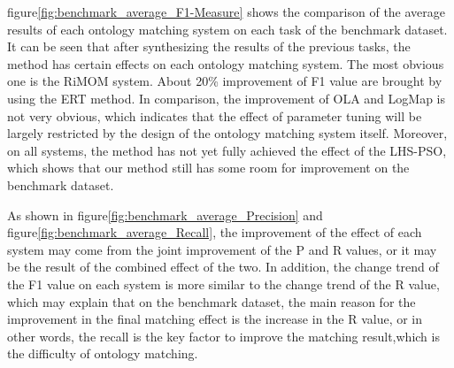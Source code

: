 \documentclass[twoside]{article}
\begin{document}
figure\ref{fig:benchmark_average_F1-Measure} shows the comparison of the average results of each ontology matching system on each task of the benchmark dataset. It can be seen that after synthesizing the results of the previous tasks, the method has certain effects on each ontology matching system. The most obvious one is the RiMOM system. About 20\% improvement of F1 value are brought by using the ERT method.
In comparison, the improvement of OLA and LogMap is not very obvious, which indicates that the effect of parameter tuning will be largely restricted by the design of the ontology matching system itself.
Moreover, on all systems, the method has not yet fully achieved the effect of the LHS-PSO, which shows that our method still has some room for improvement on the benchmark dataset.

As shown in figure\ref{fig:benchmark_average_Precision} and figure\ref{fig:benchmark_average_Recall}, the improvement of the effect of each system may come from the joint improvement of the P and R values, or it may be the result of the combined effect of the two.
In addition, the change trend of the F1 value on each system is more similar to the change trend of the R value, which may explain that on the benchmark dataset, the main reason for the improvement in the final matching effect is the increase in the R value, or in other words, the recall is the key factor to improve the matching result,which is the difficulty of ontology matching.
\end{document}
